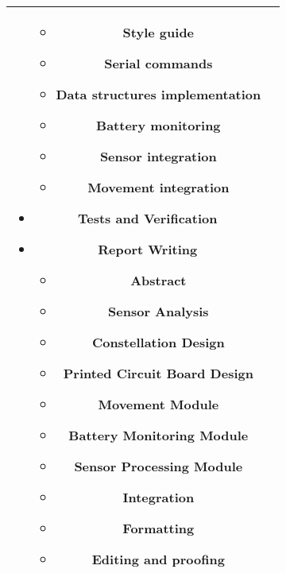 \documentclass[conference]{IEEEtran}
\begin{document}
\begin{tabularx}{\linewidth}{ | c | X | }
\begin{itemize}
\begin{itemize}
			      \item Style guide
			      \item Serial commands
			      \item Data structures implementation
			      \item Battery monitoring
			      \item Sensor integration
			      \item Movement integration
		      \end{itemize}
		        \item Tests and Verification
		        \item Report Writing
		              \begin{itemize}
			      \item Abstract
			      \item Sensor Analysis
			      \item Constellation Design
			      \item Printed Circuit Board Design
			      \item Movement Module
			      \item Battery Monitoring Module
			      \item Sensor Processing Module
			      \item Integration
			      \item Formatting
			      \item Editing and proofing
		      \end{itemize}
	        \end{itemize} \\
	\hline
\end{tabularx}
\end{document}

